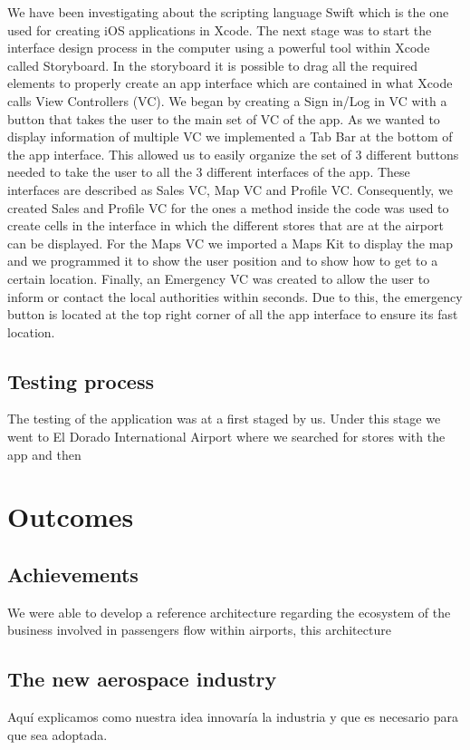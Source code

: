 \documentclass[12pt]{article}
\begin{document}
We have been investigating about the scripting language Swift which is the one used for creating iOS applications in Xcode. The next stage was to start the interface design process in the computer using a powerful tool within Xcode called Storyboard. In the storyboard it is possible to drag all the required elements to properly create an app interface which are contained in what Xcode calls View Controllers (VC). We began by creating a Sign in/Log in VC with a button that takes the user to the main set of VC of the app. As we wanted to display information of multiple VC we implemented a Tab Bar at the bottom of the app interface. This allowed us to easily organize the set of 3 different buttons needed to take the user to all the 3 different interfaces of the app. These interfaces are described as Sales VC, Map VC and Profile VC. Consequently, we created Sales and Profile VC for the ones a method inside the code was used to create cells in the interface in which the different stores that are at the airport can be displayed. For the Maps VC we imported a Maps Kit to display the map and we programmed it to show the user position and to show how to get to a certain location. Finally, an Emergency VC was created to allow the user to inform or contact the local authorities within seconds. Due to this, the emergency button is located at the top right corner of all the app interface to ensure its fast location.\\

\subsection{Testing process}

The testing of the application was at a first staged by us. Under this stage we went to El Dorado International Airport where we searched for stores with the app and then 


\section{Outcomes}

\subsection{Achievements}

We were able to develop a reference architecture regarding the ecosystem of the business involved in passengers flow within airports, this architecture 

\subsection{The new aerospace industry}
Aquí explicamos como nuestra idea innovaría la industria y que es necesario para que sea adoptada.



\end{document}
